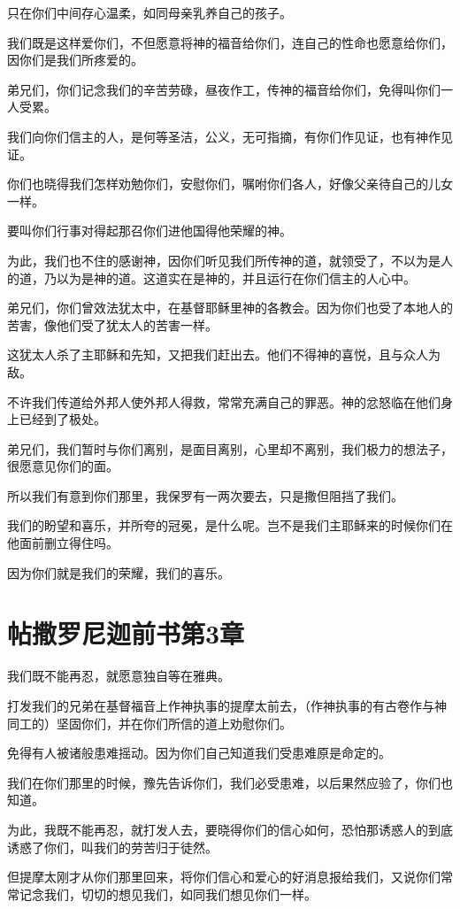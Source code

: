 \documentclass[12pt,oneside]{book}
\begin{document}
只在你们中间存心温柔，如同母亲乳养自己的孩子。

我们既是这样爱你们，不但愿意将神的福音给你们，连自己的性命也愿意给你们，因你们是我们所疼爱的。

弟兄们，你们记念我们的辛苦劳碌，昼夜作工，传神的福音给你们，免得叫你们一人受累。

我们向你们信主的人，是何等圣洁，公义，无可指摘，有你们作见证，也有神作见证。

你们也晓得我们怎样劝勉你们，安慰你们，嘱咐你们各人，好像父亲待自己的儿女一样。

要叫你们行事对得起那召你们进他国得他荣耀的神。

为此，我们也不住的感谢神，因你们听见我们所传神的道，就领受了，不以为是人的道，乃以为是神的道。这道实在是神的，并且运行在你们信主的人心中。

弟兄们，你们曾效法犹太中，在基督耶稣里神的各教会。因为你们也受了本地人的苦害，像他们受了犹太人的苦害一样。

这犹太人杀了主耶稣和先知，又把我们赶出去。他们不得神的喜悦，且与众人为敌。

不许我们传道给外邦人使外邦人得救，常常充满自己的罪恶。神的忿怒临在他们身上已经到了极处。

弟兄们，我们暂时与你们离别，是面目离别，心里却不离别，我们极力的想法子，很愿意见你们的面。

所以我们有意到你们那里，我保罗有一两次要去，只是撒但阻挡了我们。

我们的盼望和喜乐，并所夸的冠冕，是什么呢。岂不是我们主耶稣来的时候你们在他面前删立得住吗。

因为你们就是我们的荣耀，我们的喜乐。

\chapter{帖撒罗尼迦前书第3章}
我们既不能再忍，就愿意独自等在雅典。

打发我们的兄弟在基督福音上作神执事的提摩太前去，（作神执事的有古卷作与神同工的）坚固你们，并在你们所信的道上劝慰你们。

免得有人被诸般患难摇动。因为你们自己知道我们受患难原是命定的。

我们在你们那里的时候，豫先告诉你们，我们必受患难，以后果然应验了，你们也知道。

为此，我既不能再忍，就打发人去，要晓得你们的信心如何，恐怕那诱惑人的到底诱惑了你们，叫我们的劳苦归于徒然。

但提摩太刚才从你们那里回来，将你们信心和爱心的好消息报给我们，又说你们常常记念我们，切切的想见我们，如同我们想见你们一样。
\end{document}

